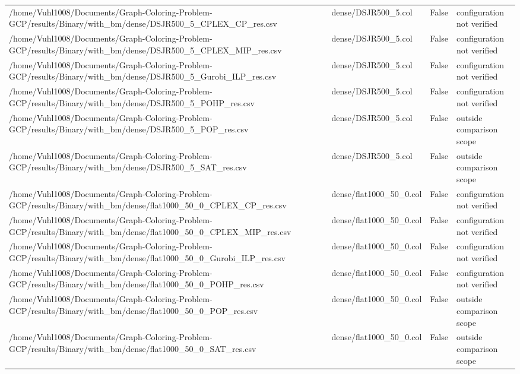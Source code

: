 \begin{table}[htbp]
\begin{tabular}{llll}
/home/Vuhl1008/Documents/Graph-Coloring-Problem-GCP/results/Binary/with\_bm/dense/DSJR500\_5\_CPLEX\_CP\_res.csv & dense/DSJR500\_5.col & False & configuration not verified \\
/home/Vuhl1008/Documents/Graph-Coloring-Problem-GCP/results/Binary/with\_bm/dense/DSJR500\_5\_CPLEX\_MIP\_res.csv & dense/DSJR500\_5.col & False & configuration not verified \\
/home/Vuhl1008/Documents/Graph-Coloring-Problem-GCP/results/Binary/with\_bm/dense/DSJR500\_5\_Gurobi\_ILP\_res.csv & dense/DSJR500\_5.col & False & configuration not verified \\
/home/Vuhl1008/Documents/Graph-Coloring-Problem-GCP/results/Binary/with\_bm/dense/DSJR500\_5\_POHP\_res.csv & dense/DSJR500\_5.col & False & configuration not verified \\
/home/Vuhl1008/Documents/Graph-Coloring-Problem-GCP/results/Binary/with\_bm/dense/DSJR500\_5\_POP\_res.csv & dense/DSJR500\_5.col & False & outside comparison scope \\
/home/Vuhl1008/Documents/Graph-Coloring-Problem-GCP/results/Binary/with\_bm/dense/DSJR500\_5\_SAT\_res.csv & dense/DSJR500\_5.col & False & outside comparison scope \\
/home/Vuhl1008/Documents/Graph-Coloring-Problem-GCP/results/Binary/with\_bm/dense/flat1000\_50\_0\_CPLEX\_CP\_res.csv & dense/flat1000\_50\_0.col & False & configuration not verified \\
/home/Vuhl1008/Documents/Graph-Coloring-Problem-GCP/results/Binary/with\_bm/dense/flat1000\_50\_0\_CPLEX\_MIP\_res.csv & dense/flat1000\_50\_0.col & False & configuration not verified \\
/home/Vuhl1008/Documents/Graph-Coloring-Problem-GCP/results/Binary/with\_bm/dense/flat1000\_50\_0\_Gurobi\_ILP\_res.csv & dense/flat1000\_50\_0.col & False & configuration not verified \\
/home/Vuhl1008/Documents/Graph-Coloring-Problem-GCP/results/Binary/with\_bm/dense/flat1000\_50\_0\_POHP\_res.csv & dense/flat1000\_50\_0.col & False & configuration not verified \\
/home/Vuhl1008/Documents/Graph-Coloring-Problem-GCP/results/Binary/with\_bm/dense/flat1000\_50\_0\_POP\_res.csv & dense/flat1000\_50\_0.col & False & outside comparison scope \\
/home/Vuhl1008/Documents/Graph-Coloring-Problem-GCP/results/Binary/with\_bm/dense/flat1000\_50\_0\_SAT\_res.csv & dense/flat1000\_50\_0.col & False & outside comparison scope \\

\end{tabular}
\end{table}
